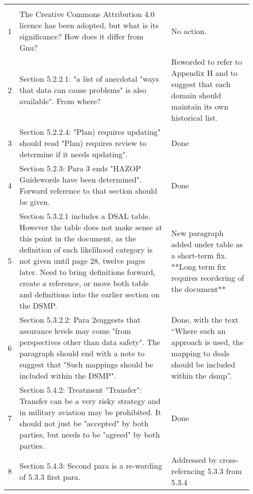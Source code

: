 \begin{longtable}[H]
{|L{}|L{}|L{}|}
\hline
{} &  & \\
\hline
  \endfirsthead
  \hline{} &  & \\\hline
  \endhead
  \endfoot
  \endlastfoot
  
  1&The Creative Commons Attribution 4.0 licence has been adopted, but what is its significance? How does it differ from Gnu?&No action.\\\hline
  2&Section 5.2.2.1: "a list of anecdotal "ways that data can cause problems" is also available". From where?&Reworded to refer to Appendix H and to suggest that each domain should maintain its own historical list.\\\hline
  3&Section 5.2.2.4: "Plan) requires updating" should read "Plan) requires review to determine if it needs updating".&Done\\\hline
  4&Section 5.2.3: Para 3 ends "HAZOP Guidewords have been determined". Forward reference to that section should be given.&Done\\\hline
  5&Section 5.3.2.1 includes a DSAL table. However the table does not make sense at this point in the document, as the definition of each likelihood category is not given until page 28, twelve pages later. Need to bring definitions forward, create a reference, or move both table and definitions into the earlier section on the DSMP.&New paragraph added under table as a short-term fix. **Long term fix requires reordering of the document**\\\hline
  6&Section 5.3.2.2: Para 2suggests that assurance levels may come "from perspectives other than data safety". The paragraph should end with a note to suggest that "Such mappings should be included within the DSMP".&Done, with the text ``Where such an approach is used, the mapping to \glspl{dsal} should be included within the \gls{dsmp}''.\\\hline
  7&Section 5.4.2: Treatment "Transfer": Transfer can be a very risky strategy and in military aviation may be prohibited. It should not just be "accepted" by both parties, but needs to be "agreed" by both parties.&Done\\\hline
  8&Section 5.4.3: Second para is a re-wording of 5.3.3 first para.&Addressed by cross-referncing 5.3.3 from 5.3.4\\\hline

\end{longtable}
